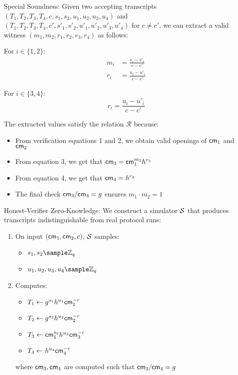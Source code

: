 {\noindent Special Soundness: Given two accepting transcripts $(T_1,T_2,T_3,T_4,c,s_1,s_2,u_1,u_2,u_3,u_4)$ and $(T_1,T_2,T_3,T_4,c',s'_1,s'_2,u'_1,u'_2,u'_3,u'_4)$ for $c \neq c'$, we can extract a valid witness $(m_1,m_2,r_1,r_2,r_3,r_4)$ as follows:

For $i \in \{1,2\}$:
\begin{align*}
m_i &= \frac{s_i - s'_i}{c - c'} \\
r_i &= \frac{u_i - u'_i}{c - c'} 
\end{align*}

For $i \in \{3,4\}$:
\[
r_i = \frac{u_i - u'_i}{c - c'}
\]

\noindent The extracted values satisfy the relation $\mathcal{R}$ because:
\begin{itemize}
    \item From verification equations 1 and 2, we obtain valid openings of $\mathsf{cm}_1$ and $\mathsf{cm}_2$
    \item From equation 3, we get that $\mathsf{cm}_3 = \mathsf{cm}_1^{m_2}h^{r_3}$
    \item From equation 4, we get that $\mathsf{cm}_4 = h^{r_4}$
    \item The final check $\mathsf{cm}_3/\mathsf{cm}_4 = g$ ensures $m_1 \cdot m_2 = 1$
\end{itemize}

\noindent Honest-Verifier Zero-Knowledge: We construct a simulator $\mathcal{S}$ that produces transcripts indistinguishable from real protocol runs:

\begin{enumerate}
    \item On input $(\mathsf{cm}_1,\mathsf{cm}_2,c)$, $\mathcal{S}$ samples:
        \begin{itemize}
            \item $s_1,s_2 \sample \Z_q$
            \item $u_1,u_2,u_3,u_4 \sample \Z_q$
        \end{itemize}
    
    \item Computes:
        \begin{itemize}
            \item $T_1 \gets g^{s_1}h^{u_1}\mathsf{cm}_1^{-c}$
            \item $T_2 \gets g^{s_2}h^{u_2}\mathsf{cm}_2^{-c}$
            \item $T_3 \gets \mathsf{cm}_1^{s_2}h^{u_3}\mathsf{cm}_3^{-c}$
            \item $T_4 \gets h^{u_4}\mathsf{cm}_4^{-c}$
        \end{itemize}
        where $\mathsf{cm}_3,\mathsf{cm}_4$ are computed such that $\mathsf{cm}_3/\mathsf{cm}_4 = g$
    

\end{enumerate}}

